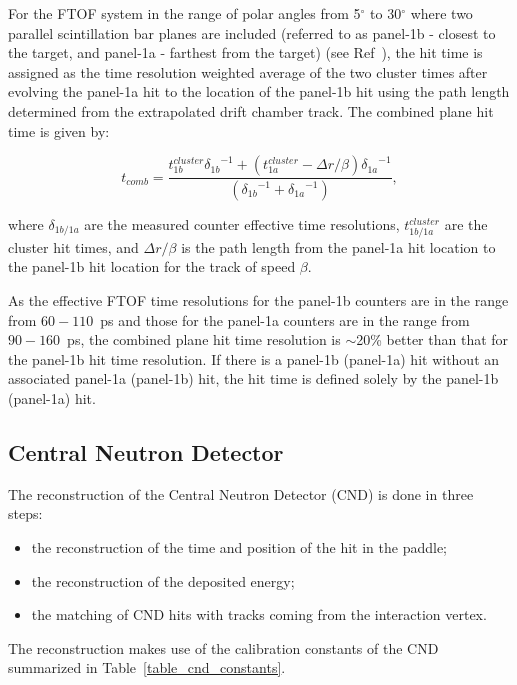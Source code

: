 \documentclass{elsart}
\begin{document}
For the FTOF system in the range of polar angles from 5$^\circ$ to 30$^\circ$ where two parallel scintillation
bar planes are included (referred to as panel-1b - closest to the target, and panel-1a - farthest from the target)
(see Ref~\cite{ftof-nim}), the hit time is assigned as the time resolution weighted average of the two cluster times
after evolving the panel-1a hit to the location of the panel-1b hit using the path length determined from the
extrapolated drift chamber track. The combined plane hit time is given by:

\begin{equation}
t_{comb} = \dfrac{ t_{1b}^{cluster} {\delta_{1b}}^{-1} + (t_{1a}^{cluster} - \Delta r/\beta) {\delta_{1a}}^{-1}}
           {\left( {\delta_{1b}}^{-1} + {\delta_{1a}}^{-1} \right)},
\end{equation}

\noindent
where $\delta_{1b/1a}$ are the measured counter effective time resolutions, $t_{1b/1a}^{cluster}$ are the cluster
hit times, and $\Delta r/\beta$ is the path length from the panel-1a hit location to the panel-1b hit location for
the track of speed $\beta$.

As the effective FTOF time resolutions for the panel-1b counters are in the range from $60-110$~ps and those
for the panel-1a counters are in the range from $90-160$~ps, the combined plane hit time resolution is $\sim$20\%
better than that for the panel-1b hit time resolution. If there is a panel-1b (panel-1a) hit without an associated
panel-1a (panel-1b) hit, the hit time is defined solely by the panel-1b (panel-1a) hit.

\subsection{Central Neutron Detector}

The reconstruction of the Central Neutron Detector (CND) is done in three steps:

\begin{itemize}
\item{the reconstruction of the time and position of the hit in the paddle;}
\item{the reconstruction of the deposited energy;}
\item{the matching of CND hits with tracks coming from the interaction vertex.}
\end{itemize}

The reconstruction makes use of the calibration constants of the CND summarized in
Table~\ref{table_cnd_constants}.
\end{document}
